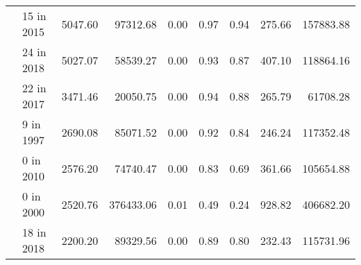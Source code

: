 \begin{tabular}{llrrrrrrr}
   & 15 in 2015 &                                     5047.60 &                                        97312.68 &                                          0.00 &                                               0.97 &                                        0.94 &                                             275.66 &                                        157883.88 \\
   & 24 in 2018 &                                     5027.07 &                                        58539.27 &                                          0.00 &                                               0.93 &                                        0.87 &                                             407.10 &                                        118864.16 \\
   & 22 in 2017 &                                     3471.46 &                                        20050.75 &                                          0.00 &                                               0.94 &                                        0.88 &                                             265.79 &                                         61708.28 \\
   & 9 in 1997 &                                     2690.08 &                                        85071.52 &                                          0.00 &                                               0.92 &                                        0.84 &                                             246.24 &                                        117352.48 \\
   & 0 in 2010 &                                     2576.20 &                                        74740.47 &                                          0.00 &                                               0.83 &                                        0.69 &                                             361.66 &                                        105654.88 \\
   & 0 in 2000 &                                     2520.76 &                                       376433.06 &                                          0.01 &                                               0.49 &                                        0.24 &                                             928.82 &                                        406682.20 \\
   & 18 in 2018 &                                     2200.20 &                                        89329.56 &                                          0.00 &                                               0.89 &                                        0.80 &                                             232.43 &                                        115731.96 \\

\end{tabular}
